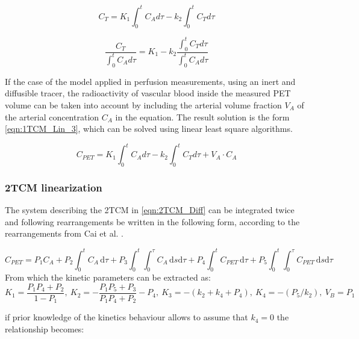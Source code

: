 \begin{equation}
C_T = K_1 \int_{0}^{t} C_A d\tau  - k_2 \int_{0}^{t} C_T d\tau
\label{eqn:1TCM_Lin}
\end{equation}

\begin{equation}
\frac{C_T}{\int_{0}^{t} C_A d\tau} = K_1 - k_2 \frac{\int_{0}^{t} C_T d\tau}{\int_{0}^{t} C_A d\tau} 
\label{eqn:1TCM_Lin_2}
\end{equation}

If the case of the model applied in perfusion measurements, using an inert and diffusible tracer, the radioactivity of vascular blood inside the measured PET volume can be taken into account by including the arterial volume fraction  $V_A$ of the arterial concentration $C_A$ in the equation. The result solution is the form \ref{eqn:1TCM_Lin_3}, which can be solved using linear least square algorithms.

\begin{equation}
C_{PET} = K_1 \int_{0}^{t} C_A d\tau - k_2 \int_{0}^{t} C_T d\tau + V_A \cdot C_A
\label{eqn:1TCM_Lin_3}
\end{equation}

\subsubsection{2TCM linearization}
The system describing the 2TCM in \ref{eqn:2TCM_Diff} can be integrated twice and following rearrangements be written in the following form, according to the rearrangements from Cai et al. \cite{Cai2002}.   

\begin{equation} \label{microLinearization_with_k4}
C_{PET} = P_1 C_A + P_2 \int_0^t \! C_A \, \mathrm{d}\tau + P_3 \int_0^t \int_0^\tau \! C_A \,\mathrm{d}s \mathrm{d}\tau
+ P_4 \int_0^t \! C_{PET} \, \mathrm{d}\tau + P_5 \int_0^t \int_0^\tau \! C_{PET} \,\mathrm{d}s \mathrm{d}\tau
\end{equation}
\newline From which the kinetic parameters can be extracted as: 
\newline
\begin{equation} \label{ParamsLinearization_with_k4}
K_1=\frac{P_1 P_4 + P_2}{1-P_1} ,\  K_2=- \frac{P_1 P_5 + P_3}{P_1 P_4 + P_2} - P_4 ,\ K_3=-(k_2 + k_4 + P_4) 
,\ K_4=-(P_5/k_2) ,\  V_B = P_1 
\end{equation}

\newline 
if prior knowledge of the kinetics behaviour allows to assume that $k_{4} = 0 $ the relationship becomes: 

